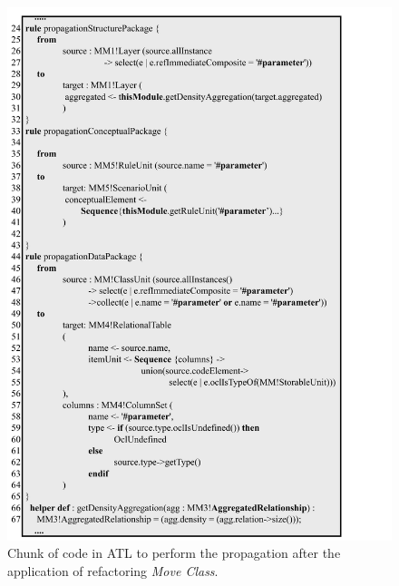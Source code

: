 \begin{figure}[h]	
	\centering
	\includegraphics[scale=0.516]{figuras/ATLPRopagationSBESFormatted}
	\caption{Chunk of code in ATL to perform the propagation after the application of refactoring \textit{Move Class}.}
	\label{fig:ATLPropagation}
\end{figure}

